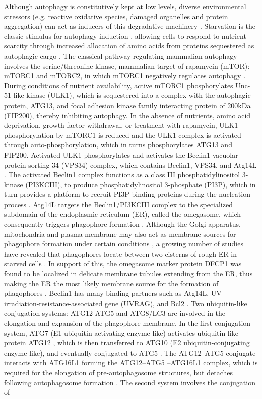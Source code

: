 Although autophagy is constitutively kept at low levels, diverse environmental stressors (e.g. reactive oxidative species, damaged organelles and protein aggregation) can act as inducers of this degradative machinery \citep{Mizushima2008}. Starvation is the classic stimulus for autophagy induction \citep{Kuma2004,Mizushima2004a}, allowing cells to respond to nutrient scarcity through increased allocation of amino acids from proteins sequestered as autophagic cargo \citep{Hosokawa2009}. The classical pathway regulating mammalian autophagy involves the serine/threonine kinase, mammalian target of rapamycin (mTOR): mTORC1 and mTORC2, in which mTORC1 negatively regulates autophagy \citep{Guertin2009,Noda1998,Ravikumar2010b}. During conditions of nutrient availability, active mTORC1 phosphorylates Unc-51-like kinase (ULK1), which is sequestered into a complex with the autophagic protein, ATG13, and focal adhesion kinase family interacting protein of 200kDa (FIP200), thereby inhibiting autophagy. In the absence of nutrients, amino acid deprivation, growth factor withdrawal, or treatment with rapamycin, ULK1 phosphorylation by mTORC1 is reduced and the ULK1 complex is activated through auto-phosphorylation, which in turns phosphorylates ATG13 and FIP200.  Activated ULK1 phosphorylates and activates the Beclin1-vacuolar protein sorting 34 (VPS34) complex, which contains Beclin1, VPS34, and Atg14L \citep{Itakura2008}. The activated Beclin1 complex functions as a class III phosphatidylinositol 3-kinase (PI3KCIII), to produce phosphatidylinositol 3-phosphate (PI3P), which in turn provides a platform to recruit PI3P-binding proteins during the nucleation process \citep{Hosokawa2009,Kim2011,sarkar2013}. Atg14L targets the Beclin1/PI3KCIII complex to the specialized subdomain of the endoplasmic reticulum (ER), called the omegasome, which consequently triggers phagophore formation \citep{Axe2008,Matsunaga2010}. Although the Golgi apparatus, mitochondria and plasma membrane may also act as membrane sources for phagophore formation under certain conditions \citep{Axe2008,Ravikumar2010}, a growing number of studies have revealed that phagophores locate between two cisterns of rough ER in starved cells \citep{Hayashi-Nishino2009,Yla-Anttila2009}. In support of this, the omegasome marker protein DFCP1 was found to be localized in delicate membrane tubules extending from the ER, thus making the ER the most likely membrane source for the formation of phagophores \citep{Uemura2014}. Beclin1 has many binding partners such as Atg14L, UV-irradiation-resistance-associated gene (UVRAG), and Bcl2 \citep{He2010}. Two ubiquitin-like conjugation systems: ATG12-ATG5 and ATG8/LC3 are involved in the elongation and expansion of the phagophore membrane. In the first conjugation system, ATG7 (E1 ubiquitin-activating enzyme-like) activates ubiquitin-like protein ATG12 \citep{Ohsumi2001,Ohsumi1998}, which is then transferred to ATG10 (E2 ubiquitin-conjugating enzyme-like), and eventually conjugated to ATG5 \citep{Geng2008}. The ATG12–ATG5 conjugate interacts with ATG16L1 forming the ATG12–ATG5 –ATG16L1 complex, which is required for the elongation of pre-autophagosome structures, but detaches following autophagosome formation \citep{Mizushima2003}. The second system involves the conjugation of 